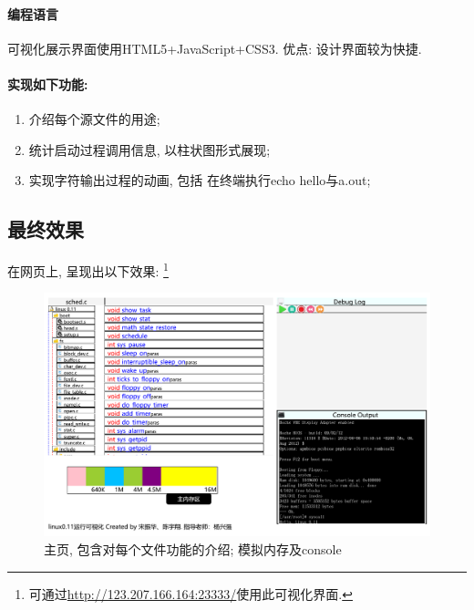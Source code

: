 \documentclass{ctexart}
\begin{document}
\paragraph{编程语言}
可视化展示界面使用HTML5+JavaScript+CSS3. 优点: 设计界面较为快捷.
\paragraph{实现如下功能:}
\begin{enumerate}
	\item 介绍每个源文件的用途;
	\item 统计启动过程调用信息, 以柱状图形式展现;
	\item 实现字符输出过程的动画, 包括
		\subitem 在终端执行echo hello与a.out;
\end{enumerate}

\subsection{最终效果}
在网页上, 呈现出以下效果: \footnote{可通过\url{http://123.207.166.164:23333/}使用此可视化界面.}
\begin{figure}[htbp]
	\centering
	\includegraphics[width=\textwidth,natwidth=773 ,natheight=487]{img/index.html.pdf}
	\caption[]{主页, 包含对每个文件功能的介绍; 模拟内存及console}
	\label{fig:indexgraph}
\end{figure}
\end{document}

